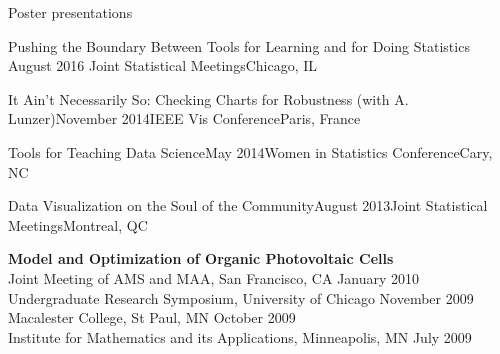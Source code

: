 \documentclass{resume} %
\begin{document}
\begin{rSection}{Poster presentations}

\begin{sSubsection}{Pushing the Boundary Between Tools for Learning and for Doing Statistics}{ }{August 2016 }{Joint Statistical Meetings}{Chicago, IL}
\end{sSubsection}

\begin{sSubsection}{It Ain't Necessarily So: Checking Charts for Robustness}{ (with A. Lunzer)}{November 2014}{IEEE Vis Conference}{Paris, France}
\end{sSubsection}

\begin{sSubsection}{Tools for Teaching Data Science}{}{May 2014}{Women in Statistics Conference}{Cary, NC}
\end{sSubsection}

\begin{sSubsection}{Data Visualization on the Soul of the Community}{}{August 2013}{Joint Statistical Meetings}{Montreal, QC}
\end{sSubsection}


{\bf Model and Optimization of Organic Photovoltaic Cells} \hfill \\ 
Joint Meeting of AMS and MAA, San Francisco, CA  \hfill January 2010 \\
Undergraduate Research Symposium, University of Chicago \hfill November 2009 \\
Macalester College, St Paul, MN \hfill  October 2009 \\ 
Institute for Mathematics and its Applications, Minneapolis, MN \hfill July 2009 \\
\end{rSection}

\end{document}
